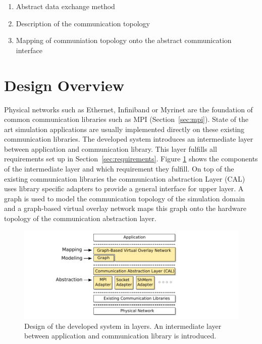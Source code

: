 \begin{enumerate}
\item Abstract data exchange method
\item Description of the communication topology
\item Mapping of communiation topology onto the abstract communication interface
\end{enumerate}



\section{Design Overview}

Physical networks such as Ethernet, Infiniband or Myrinet are the
foundation of common communication libraries such as MPI
(Section~\ref{sec:mpi}).  State of the art simulation applications are
usually implemented directly on these existing communication
libraries. The developed system introduces an intermediate layer
between application and communication library. This layer fulfills all
requirements set up in Section~\ref{sec:requirements}. Figure
\ref{fig:design} shows the components of the intermediate layer and
which requirement they fulfill.  On top of the existing communication
libraries the communication abstraction Layer (CAL) uses library
specific adapters to provide a general interface for upper layer.  A
graph is used to model the communication topology of the simulation
domain and a graph-based virtual overlay network maps this graph onto
the hardware topology of the communication abstraction layer.

\begin{figure}[H]
  \centering \includegraphics[width=\textwidth]{graphics/30_design}
  \caption{Design of the developed system in layers. An intermediate
  layer between application and communication library is introduced.}
  \label{fig:design}
\end{figure}

